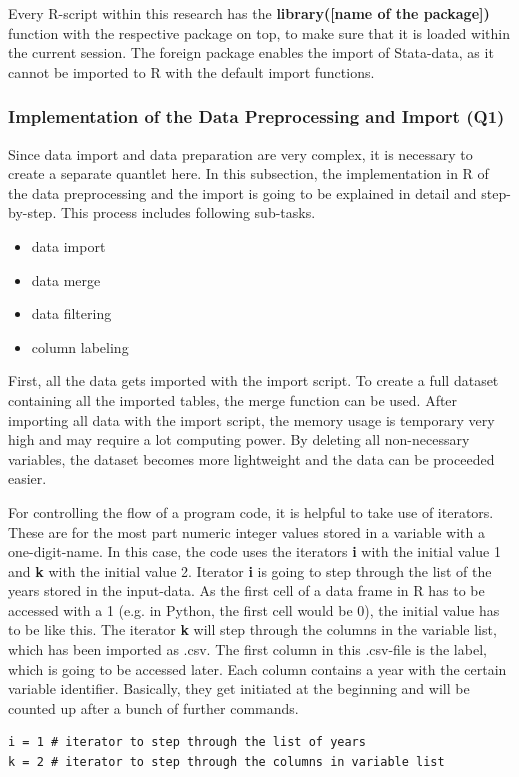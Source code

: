 \documentclass[a4paper]{article}
\begin{document}
Every R-script within this research has the \textbf{library([name of the package])} function with the respective package on top, to make sure that it is loaded within the current session.
The foreign package enables the import of Stata-data, as it cannot be imported to R with the default import functions.

\newpage

\subsubsection{Implementation of the Data Preprocessing and Import (Q1)}
Since data import and data preparation are very complex, it is necessary to create a separate quantlet here. In this subsection, the implementation in R of the data preprocessing and the import is going to be explained in detail and step-by-step. This process includes following sub-tasks.
\begin{itemize}
\item data import
\item data merge
\item data filtering
\item column labeling
\end{itemize}


First, all the data gets imported with the import script. To create a full dataset containing all the imported tables, the merge function can be used. After importing all data with the import script, the memory usage is temporary very high and may require a lot computing power. By deleting all non-necessary variables, the dataset becomes more lightweight and the data can be proceeded easier. \newline

For controlling the flow of a program code, it is helpful to take use of iterators. These are for the most part numeric integer values stored in a variable with a one-digit-name. In this case, the code uses the iterators \textbf{i} with the initial value 1 and \textbf{k} with the initial value 2. Iterator \textbf{i} is going to step through the list of the years stored in the input-data. As the first cell of a data frame in R has to be accessed with a 1 (e.g. in Python, the first cell would be 0), the initial value has to be like this. The iterator \textbf{k} will step through the columns in the variable list, which has been imported as .csv. The first column in this .csv-file is the label, which is going to be accessed later. Each column contains a year with the certain variable identifier. Basically, they get initiated at the beginning and will be counted up after a bunch of further commands. 
\begin{lstlisting}[firstnumber=14]
i = 1 # iterator to step through the list of years
k = 2 # iterator to step through the columns in variable list
\end{lstlisting}
\end{document}
